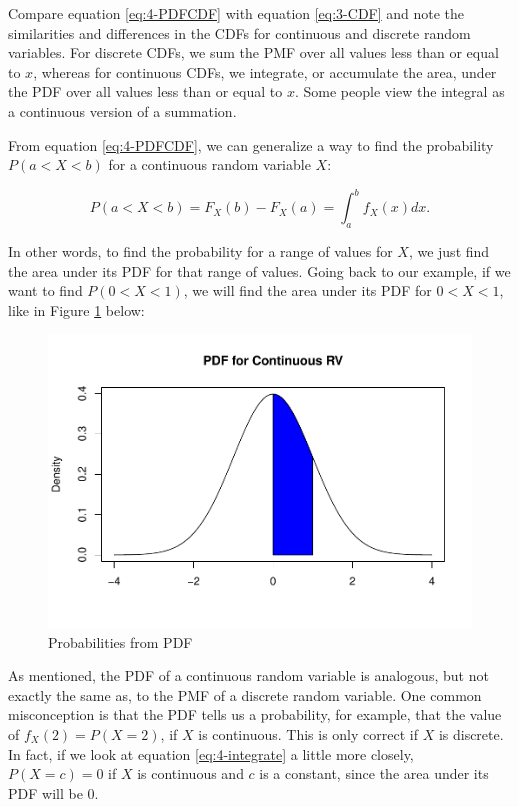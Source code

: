 \documentclass[
]{book}
\begin{document}
Compare equation \eqref{eq:4-PDFCDF} with equation \eqref{eq:3-CDF} and note the similarities and differences in the CDFs for continuous and discrete random variables. For discrete CDFs, we sum the PMF over all values less than or equal to \(x\), whereas for continuous CDFs, we integrate, or accumulate the area, under the PDF over all values less than or equal to \(x\). Some people view the integral as a continuous version of a summation.

From equation \eqref{eq:4-PDFCDF}, we can generalize a way to find the probability \(P(a<X<b)\) for a continuous random variable \(X\):

\begin{equation} 
P(a<X<b) = F_X(b) - F_X(a) = \int_{a}^{b} f_X(x) dx.
\label{eq:4-integrate}
\end{equation}

In other words, to find the probability for a range of values for \(X\), we just find the area under its PDF for that range of values. Going back to our example, if we want to find \(P(0<X<1)\), we will find the area under its PDF for \(0<X<1\), like in Figure \ref{fig:4-prob2} below:

\begin{figure}
\centering
\includegraphics{bookdown-demo_files/figure-latex/4-prob2-1.pdf}
\caption{\label{fig:4-prob2}Probabilities from PDF}
\end{figure}

As mentioned, the PDF of a continuous random variable is analogous, but not exactly the same as, to the PMF of a discrete random variable. One common misconception is that the PDF tells us a probability, for example, that the value of \(f_X(2) = P(X=2)\), if \(X\) is continuous. This is only correct if \(X\) is discrete. In fact, if we look at equation \eqref{eq:4-integrate} a little more closely, \(P(X=c) = 0\) if \(X\) is continuous and \(c\) is a constant, since the area under its PDF will be 0.
\end{document}
